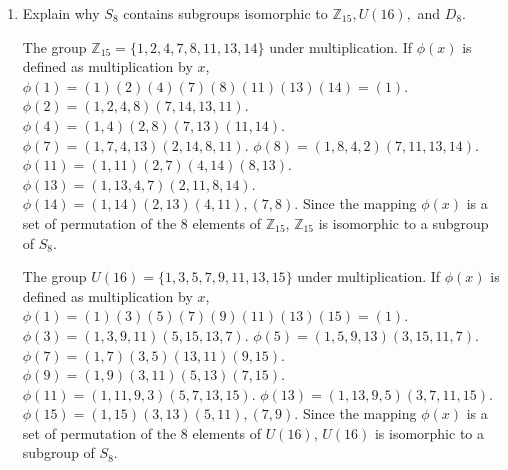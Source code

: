 \documentclass{article}
\newcommand{\Z}{\mathbb Z}
\begin{document}
\begin{enumerate}
\begin{flushleft}
    \end{flushleft}
    \item Explain why $S_8$ contains subgroups isomorphic to $\Z_{15} , U (16),$ and $D_8$.
    \begin{flushleft}
    The group $\Z_{15} = \{ 1, 2, 4, 7, 8, 11, 13, 14 \}$ under multiplication. If $\phi(x)$ is defined as multiplication by $x$, $\phi(1) = (1)(2)(4)(7)(8)(11)(13)(14) = (1)$. $\phi(2) = (1, 2, 4, 8)(7, 14, 13, 11)$. $\phi(4) = (1, 4)(2, 8)(7, 13)(11, 14)$. $\phi(7) = (1, 7, 4, 13)(2, 14, 8, 11)$. $\phi(8) = (1, 8, 4, 2)(7, 11, 13, 14)$. $\phi(11) = (1, 11)(2, 7)(4, 14)(8,13)$. $\phi(13) = (1, 13, 4, 7)(2, 11, 8, 14)$. $\phi(14) = (1, 14)(2, 13)(4, 11), (7,8)$. Since the mapping $\phi(x)$ is a set of permutation of the 8 elements of $\Z_{15}$, $\Z_{15}$ is isomorphic to a subgroup of $S_8$. \newline
    
    The group $U(16) = \{ 1, 3, 5, 7, 9, 11, 13, 15 \}$ under multiplication. If $\phi(x)$ is defined as multiplication by $x$, $\phi(1) = (1)(3)(5)(7)(9)(11)(13)(15) = (1)$. $\phi(3) = (1, 3, 9, 11)(5, 15, 13, 7)$. $\phi(5) = (1, 5, 9, 13)(3, 15, 11, 7)$. $\phi(7) = (1, 7)(3, 5)(13, 11)(9, 15)$. $\phi(9) = (1, 9)(3, 11)(5, 13)(7, 15)$. $\phi(11) = (1, 11, 9, 3)(5, 7, 13, 15)$. $\phi(13) = (1, 13, 9, 5)(3, 7, 11, 15)$. $\phi(15) = (1, 15)(3, 13)(5, 11), (7,9)$. Since the mapping $\phi(x)$ is a set of permutation of the 8 elements of $U(16)$, $U(16)$ is isomorphic to a subgroup of $S_8$. \newline
    

\end{flushleft}
\end{enumerate}
\end{document}
